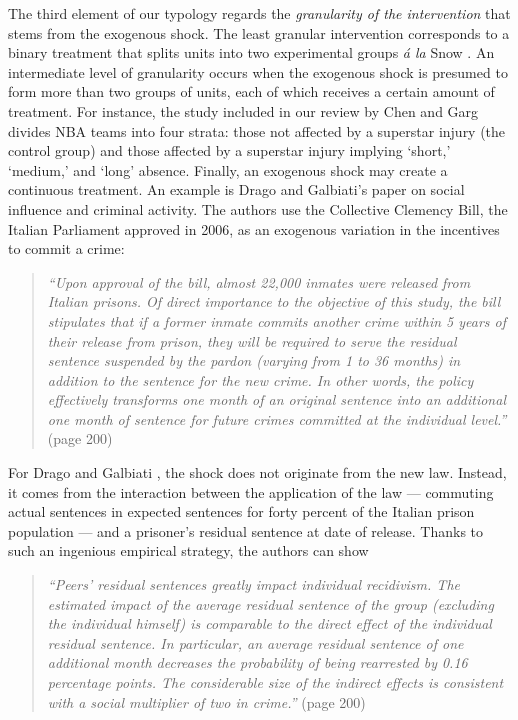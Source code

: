 \begin{refsection}
The third element of our typology regards the \textit{granularity of the 
intervention} that stems from the exogenous shock. The least granular 
intervention corresponds to a binary treatment that splits units into 
two experimental groups \textit{\'a la} Snow \autocite*{snow_1855}.
An intermediate level of granularity occurs when the exogenous shock 
is presumed to form more than two groups of units, each of which receives
a certain amount of treatment. For instance, the study included in our
review by Chen and Garg \autocite*{chen20181239} divides NBA teams into 
four strata: those not affected by a superstar injury (the control group) and 
those affected by a superstar injury implying `short,' `medium,' and `long' 
absence. Finally, an exogenous shock may create a continuous treatment. 
An example is  Drago and Galbiati's \autocite*{drago_galbiati_2012} paper
on social influence and criminal activity. The authors use the Collective 
Clemency Bill, the Italian Parliament approved in 2006, as an exogenous 
variation in the incentives to commit a crime:

\begin{quote}
  \textit{
    ``Upon approval of the bill, almost 22,000 inmates were released from Italian
    prisons. Of direct importance to the objective of this study, the bill
    stipulates that if a former inmate commits another crime within 5 years of
    their release from prison, they will be required to serve the residual
    sentence suspended by the pardon (varying from 1 to 36 months) in addition
    to the sentence for the new crime. In other words, the policy effectively
    transforms one month of an original sentence into an additional one month of
    sentence for future crimes committed at the individual level.''
  }
  (page 200)
\end{quote}

For Drago and Galbiati \autocite*{drago_galbiati_2012}, the shock does not
originate from the new law. Instead, it comes from the interaction between the
application of the law 
--- commuting actual sentences in expected sentences for forty percent of 
the Italian prison population --- and a prisoner's residual sentence at date of
release. Thanks to such an ingenious empirical strategy, the authors can show

\begin{quote}
  \textit{
    ``Peers' residual sentences greatly impact individual recidivism. The estimated
    impact of the average residual sentence of the group (excluding the
    individual himself) is comparable to the direct effect of the individual
    residual sentence. In particular, an average residual sentence of one
    additional month decreases the probability of being rearrested by 0.16
    percentage points. The considerable size of the indirect effects is
    consistent with a social multiplier of two in crime.''
  } (page 200)
\end{quote}



\end{refsection}
